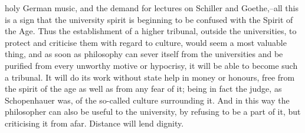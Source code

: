 holy German music, and the demand for lectures on Schiller and
Goethe,--all this is a sign that the university spirit is beginning
to be confused with the Spirit of the Age. Thus the establishment of
a higher tribunal, outside the universities, to protect and criticise
them with regard to culture, would seem a most valuable thing, and as
soon as philosophy can sever itself from the universities and be
purified from every unworthy motive or hypocrisy, it will be able to
become such a tribunal. It will do its work without state help in
money or honours, free from the spirit of the age as well as from any
fear of it; being in fact the judge, as Schopenhauer was, of the
so-called culture surrounding it. And in this way the philosopher can
also be useful to the university, by refusing to be a part of it, but
criticising it from afar. Distance will lend dignity.

